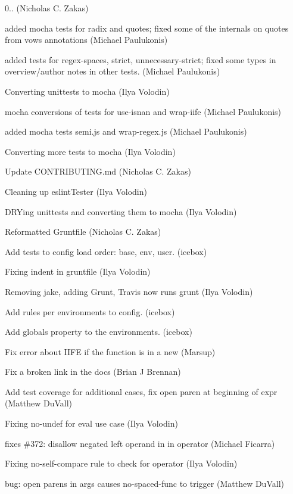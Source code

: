 \begin{DoxyItemize}
\item 0.. (Nicholas C. Zakas)
\item added mocha tests for radix and quotes; fixed some of the internals on quotes from vows annotations (Michael Paulukonis)
\item added tests for regex-\/spaces, strict, unnecessary-\/strict; fixed some types in overview/author notes in other tests. (Michael Paulukonis)
\item Converting unittests to mocha (Ilya Volodin)
\item mocha conversions of tests for \textquotesingle{}use-\/isnan\textquotesingle{} and \textquotesingle{}wrap-\/iife\textquotesingle{} (Michael Paulukonis)
\item added mocha tests semi.\+js and wrap-\/regex.\+js (Michael Paulukonis)
\item Converting more tests to mocha (Ilya Volodin)
\item Update C\+O\+N\+T\+R\+I\+B\+U\+T\+I\+N\+G.\+md (Nicholas C. Zakas)
\item Cleaning up eslint\+Tester (Ilya Volodin)
\item D\+R\+Ying unittests and converting them to mocha (Ilya Volodin)
\item Reformatted Gruntfile (Nicholas C. Zakas)
\item Add tests to config load order\+: base, env, user. (icebox)
\item Fixing indent in gruntfile (Ilya Volodin)
\item Removing jake, adding Grunt, Travis now runs grunt (Ilya Volodin)
\item Add rules per environments to config. (icebox)
\item Add globals property to the environments. (icebox)
\item Fix error about I\+I\+FE if the function is in a new (Marsup)
\item Fix a broken link in the docs (Brian J Brennan)
\item Add test coverage for additional cases, fix open paren at beginning of expr (Matthew Du\+Vall)
\item Fixing no-\/undef for eval use case (Ilya Volodin)
\item fixes \#372\+: disallow negated left operand in {\ttfamily in} operator (Michael Ficarra)
\item Fixing no-\/self-\/compare rule to check for operator (Ilya Volodin)
\item bug\+: open parens in args causes no-\/spaced-\/func to trigger (Matthew Du\+Vall)

\end{DoxyItemize}
